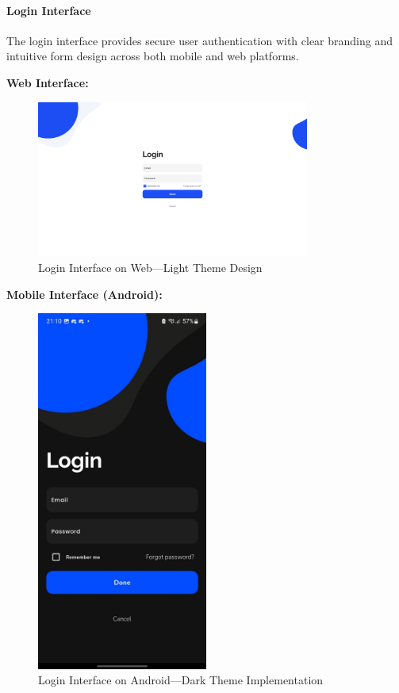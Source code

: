 \paragraph{Login Interface}
The login interface provides secure user authentication with clear branding and intuitive form design across both mobile and web platforms.

\textbf{Web Interface:}
\begin{figure}[!htbp]
    \centering
    \includegraphics[width=0.8\textwidth]{figures/ui/login_web.png}
    \caption{Login Interface on Web---Light Theme Design}
    \label{fig:web_login}
\end{figure}

\textbf{Mobile Interface (Android):}
\begin{figure}[!htbp]
    \centering
    \includegraphics[width=0.5\textwidth]{figures/ui/login_android.jpeg}
    \caption{Login Interface on Android---Dark Theme Implementation}
    \label{fig:android_login}
\end{figure}

